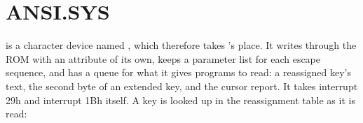 \section{ANSI.SYS}

 is a character device named , which therefore
takes 's place. It writes through the ROM with an attribute of
its own, keeps a parameter list for each escape sequence, and has a queue
for what it gives programs to read: a reassigned key's text, the second
byte of an extended key, and the cursor report. It takes interrupt 29h and
interrupt 1Bh itself. A key is looked up in the reassignment table as it
is read:


